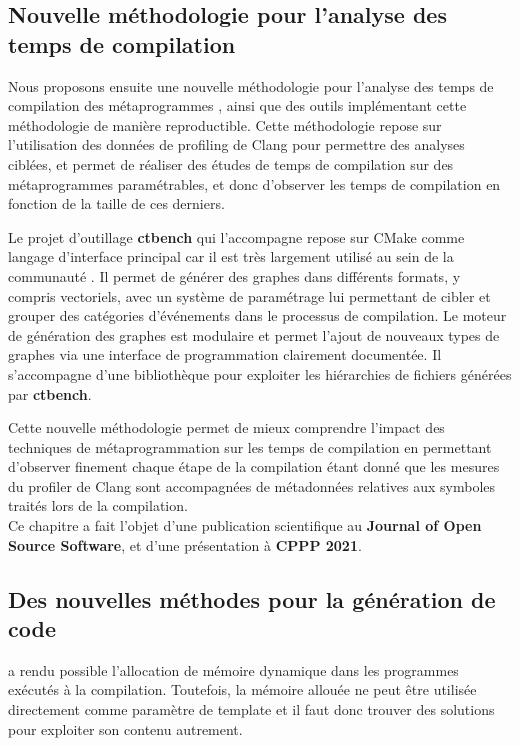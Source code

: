 \documentclass[main]{subfiles}
\begin{document}
\subsection*{
  Nouvelle m\'ethodologie pour l'analyse des temps de compilation
}

Nous proposons ensuite une nouvelle m\'ethodologie pour l'analyse des temps
de compilation des m\'etaprogrammes \cpp, ainsi que des outils impl\'ementant
cette m\'ethodologie de mani\`ere reproductible. Cette m\'ethodologie
repose sur l'utilisation des donn\'ees de profiling de Clang pour permettre
des analyses cibl\'ees, et permet de r\'ealiser des \'etudes de temps
de compilation sur des m\'etaprogrammes param\'etrables, et donc d'observer
les temps de compilation en fonction de la taille de ces derniers.

Le projet d'outillage \textbf{ctbench} qui l'accompagne repose sur CMake
comme langage d'interface principal car il est tr\`es largement utilis\'e
au sein de la communaut\'e \cpp. Il permet de g\'en\'erer des graphes dans
diff\'erents formats, y compris vectoriels, avec un syst\`eme de param\'etrage
lui permettant de cibler et grouper des cat\'egories d'\'ev\'enements
dans le processus de compilation.
Le moteur de g\'en\'eration des graphes est modulaire
et permet l'ajout de nouveaux types de graphes via une interface
de programmation clairement document\'ee. Il s'accompagne d'une biblioth\`eque
\cpp pour exploiter les hi\'erarchies de fichiers g\'en\'er\'ees
par \textbf{ctbench}.

Cette nouvelle m\'ethodologie permet de mieux comprendre l'impact des
techniques de m\'etaprogrammation sur les temps de compilation en permettant
d'observer finement chaque \'etape de la compilation \'etant donn\'e que les
mesures du profiler de Clang sont accompagn\'ees de m\'etadonn\'ees relatives
aux symboles \cpp trait\'es lors de la compilation.
\\

Ce chapitre a fait l'objet d'une publication scientifique au
\textbf{Journal of Open Source Software}, et d'une pr\'esentation
\`a \textbf{CPPP 2021}.

\subsection*{
  Des nouvelles m\'ethodes pour la g\'en\'eration de code
}

 a rendu possible l'allocation de m\'emoire dynamique dans les programmes
\cpp ex\'ecut\'es \`a la compilation. Toutefois, la m\'emoire allou\'ee
ne peut \^etre utilis\'ee directement comme param\`etre de template et
il faut donc trouver des solutions pour exploiter son contenu autrement.
\end{document}
